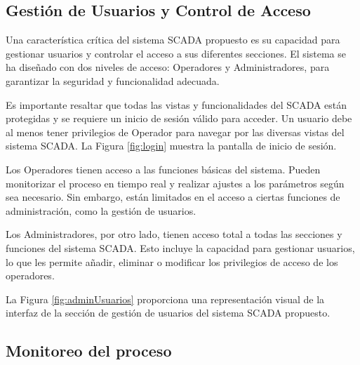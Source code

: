 
\subsection{Gestión de Usuarios y Control de Acceso}

Una característica crítica del sistema SCADA propuesto es su capacidad para gestionar usuarios y controlar el acceso a sus diferentes secciones. El sistema se ha diseñado con dos niveles de acceso: Operadores y Administradores, para garantizar la seguridad y funcionalidad adecuada.

Es importante resaltar que todas las vistas y funcionalidades del SCADA están protegidas y se requiere un inicio de sesión válido para acceder. Un usuario debe al menos tener privilegios de Operador para navegar por las diversas vistas del sistema SCADA. La Figura \ref{fig:login} muestra la pantalla de inicio de sesión.

\begin{figure}[h!]
    \centering
\end{figure}

Los Operadores tienen acceso a las funciones básicas del sistema. Pueden monitorizar el proceso en tiempo real y realizar ajustes a los parámetros según sea necesario. Sin embargo, están limitados en el acceso a ciertas funciones de administración, como la gestión de usuarios.

Los Administradores, por otro lado, tienen acceso total a todas las secciones y funciones del sistema SCADA. Esto incluye la capacidad para gestionar usuarios, lo que les permite añadir, eliminar o modificar los privilegios de acceso de los operadores.

La Figura \ref{fig:adminUsuarios} proporciona una representación visual de la interfaz de la sección de gestión de usuarios del sistema SCADA propuesto.

\begin{figure}[h!]
    \centering
\end{figure}

\subsection{Monitoreo del proceso}

